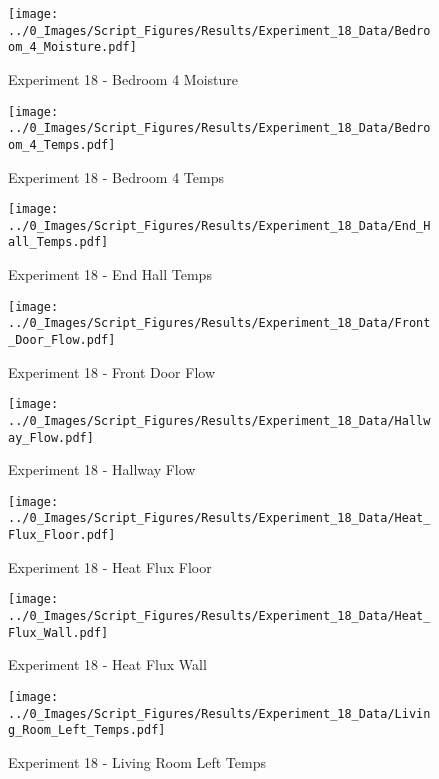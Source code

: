 	\clearpage

	\begin{figure}[H]
		\centering
		\texttt{[image: ../0\_Images/Script\_Figures/Results/Experiment\_18\_Data/Bedroom\_4\_Moisture.pdf]}
		\caption[]{Experiment 18 - Bedroom 4 Moisture}
	\end{figure}
 

	\begin{figure}[H]
		\centering
		\texttt{[image: ../0\_Images/Script\_Figures/Results/Experiment\_18\_Data/Bedroom\_4\_Temps.pdf]}
		\caption[]{Experiment 18 - Bedroom 4 Temps}
	\end{figure}
 
	\clearpage

	\begin{figure}[H]
		\centering
		\texttt{[image: ../0\_Images/Script\_Figures/Results/Experiment\_18\_Data/End\_Hall\_Temps.pdf]}
		\caption[]{Experiment 18 - End Hall Temps}
	\end{figure}
 

	\begin{figure}[H]
		\centering
		\texttt{[image: ../0\_Images/Script\_Figures/Results/Experiment\_18\_Data/Front\_Door\_Flow.pdf]}
		\caption[]{Experiment 18 - Front Door Flow}
	\end{figure}
 
	\clearpage

	\begin{figure}[H]
		\centering
		\texttt{[image: ../0\_Images/Script\_Figures/Results/Experiment\_18\_Data/Hallway\_Flow.pdf]}
		\caption[]{Experiment 18 - Hallway Flow}
	\end{figure}
 

	\begin{figure}[H]
		\centering
		\texttt{[image: ../0\_Images/Script\_Figures/Results/Experiment\_18\_Data/Heat\_Flux\_Floor.pdf]}
		\caption[]{Experiment 18 - Heat Flux Floor}
	\end{figure}
 
	\clearpage

	\begin{figure}[H]
		\centering
		\texttt{[image: ../0\_Images/Script\_Figures/Results/Experiment\_18\_Data/Heat\_Flux\_Wall.pdf]}
		\caption[]{Experiment 18 - Heat Flux Wall}
	\end{figure}
 

	\begin{figure}[H]
		\centering
		\texttt{[image: ../0\_Images/Script\_Figures/Results/Experiment\_18\_Data/Living\_Room\_Left\_Temps.pdf]}
		\caption[]{Experiment 18 - Living Room Left Temps}
	\end{figure}
 
